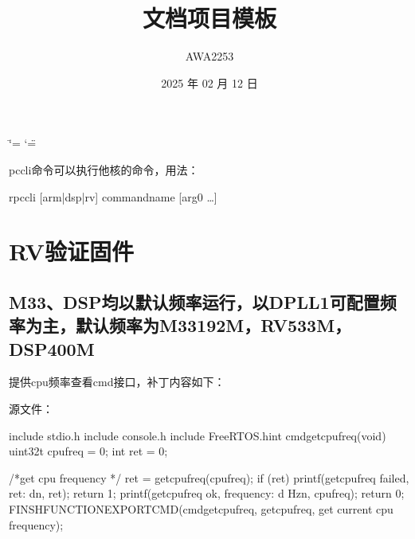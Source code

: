 \documentclass[letterpaper,10pt,english]{sphinxmanual}
\title{文档项目模板}
\date{2025 年 02 月 12 日}
\author{AWA2253}
\begin{document}
\ifdefined\shorthandoff
  \ifnum\catcode`\=\string=\active\shorthandoff{=}\fi
  \ifnum\catcode`\"=\active{}\fi
\fi

\pagestyle{empty}
\sphinxmaketitle
\pagestyle{plain}
\sphinxtableofcontents
\pagestyle{normal}
\label{\detokenize{index::doc}}


\sphinxstepscope

\sphinxAtStartPar
pccli命令可以执行他核的命令，用法：

\sphinxAtStartPar
rpccli {[}arm|dsp|rv{]} commandname {[}arg0 …{]}


\chapter{RV验证固件}
\label{\detokenize{r128_u9a8c_u8bc1_u56fa_u4ef6/r128_u9a8c_u8bc1_u56fa_u4ef6_u5f00_u53d1_u6307_u5357:rv}}\label{\detokenize{r128_u9a8c_u8bc1_u56fa_u4ef6/r128_u9a8c_u8bc1_u56fa_u4ef6_u5f00_u53d1_u6307_u5357::doc}}

\section{M33、DSP均以默认频率运行，以DPLL1可配置频率为主，默认频率为M33\sphinxhyphen{}192M，RV\sphinxhyphen{}533M，DSP\sphinxhyphen{}400M}
\label{\detokenize{r128_u9a8c_u8bc1_u56fa_u4ef6/r128_u9a8c_u8bc1_u56fa_u4ef6_u5f00_u53d1_u6307_u5357:m33dsp-dpll1-m33-192m-rv-533m-dsp-400m}}
\sphinxAtStartPar
提供cpu频率查看cmd接口，补丁内容如下：

\sphinxAtStartPar
源文件：

\begin{sphinxVerbatim}[commandchars=\\\{\}]
\PYGZsh{}include \PYGZlt{}stdio.h\PYGZgt{}
\PYGZsh{}include \PYGZlt{}console.h\PYGZgt{}
\PYGZsh{}include \PYGZlt{}FreeRTOS.h\PYGZgt{}int cmd\PYGZus{}get\PYGZus{}cpu\PYGZus{}freq(void)
\PYGZob{}
    uint32\PYGZus{}t cpu\PYGZus{}freq = 0;
    int ret = 0;

    /*get cpu frequency */
    ret = get\PYGZus{}cpu\PYGZus{}freq(\PYGZam{}cpu\PYGZus{}freq);
    if (ret) \PYGZob{}
        printf(\PYGZdq{}get\PYGZus{}cpu\PYGZus{}freq failed, ret: \PYGZpc{}d\PYGZbs{}n\PYGZdq{}, ret);
        return \PYGZhy{}1;
    \PYGZcb{}
    printf(\PYGZdq{}get\PYGZus{}cpu\PYGZus{}freq ok, frequency: \PYGZpc{}d Hz\PYGZbs{}n\PYGZdq{}, cpu\PYGZus{}freq);
    return 0;
\PYGZcb{}
FINSH\PYGZus{}FUNCTION\PYGZus{}EXPORT\PYGZus{}CMD(cmd\PYGZus{}get\PYGZus{}cpu\PYGZus{}freq, get\PYGZus{}cpu\PYGZus{}freq, get current cpu frequency);
\end{sphinxVerbatim}
\end{document}
